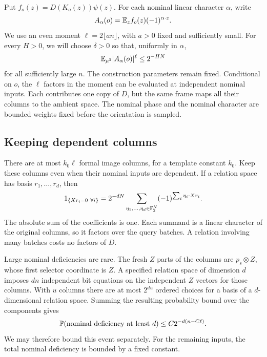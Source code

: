 Put \(f_o(z)=D(K_o(z))\psi(z)\). For each nominal linear character
\(\alpha\), write
\[
 A_\alpha(o)=\mathbb E_z f_o(z)(-1)^{\alpha\cdot z}.
\]
We use an even moment \(\ell=2\lfloor an\rfloor\), with \(a>0\) fixed
and sufficiently small. For every \(H>0\), we will choose \(\delta>0\)
so that, uniformly in \(\alpha\),
\begin{equation}\label{eq:moment-target}
 \mathbb E_{\mu^2}|A_\alpha(o)|^\ell\le2^{-HN}
\end{equation}
for all sufficiently large \(n\). The construction parameters remain fixed.
Conditional on \(o\), the \(\ell\) factors in the moment can be
evaluated at independent nominal inputs. Each contributes one copy of
\(D\), but the same frame maps all their columns to the ambient space. The nominal phase and the nominal character
are bounded weights fixed before the orientation is sampled.

\subsection{Keeping dependent columns}

There are at most \(k_0\ell\) formal image columns, for a template
constant \(k_0\). Keep these columns even when their nominal inputs
are dependent. If a relation space has basis \(r_1,\ldots,r_d\), then
\begin{equation}\label{eq:relations-fourier}
 1_{\{Xr_i=0\ \forall i\}}
 =2^{-dN}\sum_{\eta_1,\ldots,\eta_d\in\mathbb F_2^N}
       (-1)^{\sum_i\eta_i\cdot Xr_i}.
\end{equation}
The absolute sum of the coefficients is one. Each summand is a linear
character of the original columns, so it factors over the query batches.
A relation involving many batches costs no factors of \(D\).

Large nominal deficiencies are rare. The fresh \(Z\) parts of the
columns are \(p_s\otimes Z\), whose first selector coordinate is \(Z\).
A specified relation space of dimension \(d\) imposes \(dn\) independent
bit equations on the independent \(Z\) vectors for those columns.
With \(u\) columns there are at most \(2^{du}\) ordered choices for a
basis of a \(d\)-dimensional relation space. Summing the resulting
probability bound over the components gives
\begin{equation}\label{eq:nominal-tail}
 \mathbb P(\text{nominal deficiency at least }d)
 \le C2^{-d(n-C\ell)}.
\end{equation}
We may therefore bound this event separately. For the remaining inputs,
the total nominal deficiency is bounded by a fixed constant.

